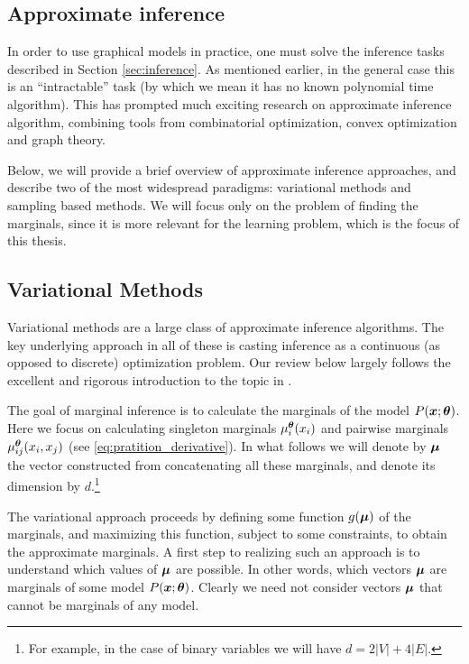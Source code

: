 \subsection{Approximate inference}
\label{sec:approx}
In order to use graphical models in practice, one must solve the inference tasks
described in Section \ref{sec:inference}. As mentioned earlier, in the general case
this is an ``intractable'' task (by which we mean it has no known polynomial time algorithm). This has prompted much exciting research on approximate inference algorithm, combining
tools from combinatorial optimization, convex optimization and graph theory. 

Below, we will provide a brief overview of approximate inference approaches, and describe two of the most widespread paradigms: variational methods and sampling based methods.  
We will focus only on the problem of finding the marginals, since it is more relevant for 
the learning problem, which is the focus of this thesis.

\subsection{Variational Methods}
\label{sec:variational_methods}
Variational methods are a large class of approximate inference algorithms. The key
underlying approach in all of these is casting inference as a continuous (as opposed to discrete) optimization problem. Our review below largely follows the excellent and rigorous introduction to the topic in \cite{wainwright2008graphical}. 

The goal of marginal inference is to calculate the marginals of the model $P(\boldsymbol{x};\boldsymbol{\theta})$. Here we focus on calculating singleton marginals $\mu_i^{\boldsymbol{\theta}}(x_i)$ and pairwise marginals  $\mu^{\boldsymbol{\theta}}_{ij}(x_i, x_j)$ (see \eqref{eq:pratition_derivative}).
In what follows we will denote by $\boldsymbol{\mu}$ the vector constructed from concatenating all these marginals, and denote its dimension by $d$.\footnote{For example, in the case of binary variables we will have $d = 2|V| + 4|E|$.}

The variational approach proceeds by defining some function $g(\boldsymbol{\mu})$ of the marginals, and maximizing this function, subject to some constraints, to obtain the approximate marginals. A first step to realizing such an approach is to understand which values of $\boldsymbol{\mu}$ are possible. In other words, which vectors $\boldsymbol{\mu}$ are marginals of some model $P(\boldsymbol{x};\boldsymbol{\theta})$. Clearly we need not consider vectors $\boldsymbol{\mu}$ that cannot be marginals of any model.

